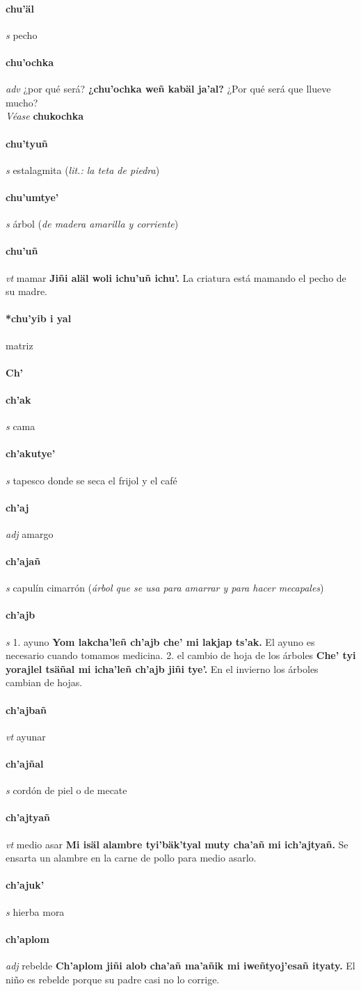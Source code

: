 \documentclass{scrbook}
\newcommand{\entry}[1]{\paragraph{#1}}
\newcommand{\alphaletter}[1]{\addsec{#1}}
\newcommand{\onedefinition}[1]{#1.}
\newcommand{\partofspeech}[1]{\textit{#1}}
\newcommand{\spanishtranslation}[1]{#1}
\newcommand{\clarification}[1]{(\textit{#1})}
\newcommand{\cholexample}[1]{\textbf{#1}}
\newcommand{\exampletranslation}[1]{#1}
\newcommand{\alsosee}[1]{\\\textit{Véase} \textbf{#1}}
\begin{document}
\begin{multicols}{2}
\entry{chu'äl}
\partofspeech{s}
\spanishtranslation{pecho}

\entry{chu'ochka}
\partofspeech{adv}
\spanishtranslation{¿por qué será?}
\cholexample{¿chu'ochka weñ kabäl ja'al?}
\exampletranslation{¿Por qué será que llueve mucho?}
\alsosee{chukochka}

\entry{chu'tyuñ}
\partofspeech{s}
\spanishtranslation{estalagmita}
\clarification{lit.: la teta de piedra}

\entry{chu'umtye'}
\partofspeech{s}
\spanishtranslation{árbol}
\clarification{de madera amarilla y corriente}

\entry{chu'uñ}
\partofspeech{vt}
\spanishtranslation{mamar}
\cholexample{Jiñi aläl woli ichu'uñ ichu'.}
\exampletranslation{La criatura está mamando el pecho de su madre.}

\entry{*chu'yib i yal}
\spanishtranslation{matriz}

\entry{Ch'}
\alphaletter{Ch'}

\entry{ch'ak}
\partofspeech{s}
\spanishtranslation{cama}

\entry{ch'akutye'}
\partofspeech{s}
\spanishtranslation{tapesco donde se seca el frijol y el café}

\entry{ch'aj}
\partofspeech{adj}
\spanishtranslation{amargo}

\entry{ch'ajañ}
\partofspeech{s}
\spanishtranslation{capulín cimarrón}
\clarification{árbol que se usa para amarrar y para hacer mecapales}

\entry{ch'ajb}
\partofspeech{s}
\onedefinition{1}
\spanishtranslation{ayuno}
\cholexample{Yom lakcha'leñ ch'ajb che' mi lakjap ts'ak.}
\exampletranslation{El ayuno es necesario cuando tomamos medicina.}
\onedefinition{2}
\spanishtranslation{el cambio de hoja de los árboles}
\cholexample{Che' tyi yorajlel tsäñal mi icha'leñ ch'ajb jiñi tye'.}
\exampletranslation{En el invierno los árboles cambian de hojas.}

\entry{ch'ajbañ}
\partofspeech{vt}
\spanishtranslation{ayunar}

\entry{ch'ajñal}
\partofspeech{s}
\spanishtranslation{cordón de piel o de mecate}

\entry{ch'ajtyañ}
\partofspeech{vt}
\spanishtranslation{medio asar}
\cholexample{Mi isäl alambre tyi'bäk'tyal muty cha'añ mi ich'ajtyañ.}
\exampletranslation{Se ensarta un alambre en la carne de pollo para medio asarlo.}

\entry{ch'ajuk'}
\partofspeech{s}
\spanishtranslation{hierba mora}

\entry{ch'aplom}
\partofspeech{adj}
\spanishtranslation{rebelde}
\cholexample{Ch'aplom jiñi alob cha'añ ma'añik mi iweñtyoj'esañ ityaty.}
\exampletranslation{El niño es rebelde porque su padre casi no lo corrige.}


\end{multicols}
\end{document}
